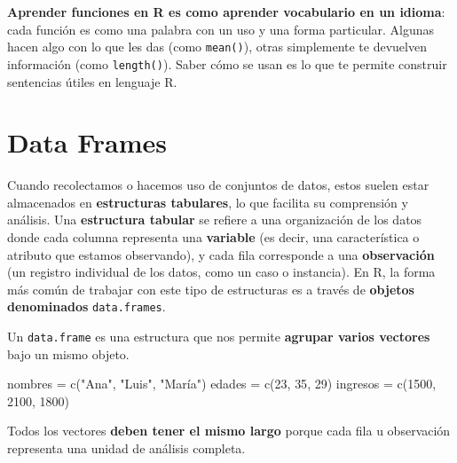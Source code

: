 \documentclass[
  letterpaper,
  DIV=11,
  numbers=noendperiod,
  twoside]{scrreprt}
\newenvironment{Shaded}{\begin{snugshade}}{\end{snugshade}}
\newcommand{\DecValTok}[1]{\textcolor[rgb]{0.68,0.00,0.00}{#1}}
\newcommand{\FunctionTok}[1]{\textcolor[rgb]{0.28,0.35,0.67}{#1}}
\newcommand{\NormalTok}[1]{\textcolor[rgb]{0.00,0.23,0.31}{#1}}
\newcommand{\OtherTok}[1]{\textcolor[rgb]{0.00,0.23,0.31}{#1}}
\newcommand{\StringTok}[1]{\textcolor[rgb]{0.13,0.47,0.30}{#1}}
\begin{document}
\textbf{Aprender funciones en R es como aprender vocabulario en un
idioma}: cada función es como una palabra con un uso y una forma
particular. Algunas hacen algo con lo que les das (como
\texttt{mean()}), otras simplemente te devuelven información (como
\texttt{length()}). Saber cómo se usan es lo que te permite construir
sentencias útiles en lenguaje R.

\chapter{Data Frames}\label{data-frames}

Cuando recolectamos o hacemos uso de conjuntos de datos, estos suelen
estar almacenados en \textbf{estructuras tabulares}, lo que facilita su
comprensión y análisis. Una \textbf{estructura tabular} se refiere a una
organización de los datos donde cada columna representa una
\textbf{variable} (es decir, una característica o atributo que estamos
observando), y cada fila corresponde a una \textbf{observación} (un
registro individual de los datos, como un caso o instancia). En R, la
forma más común de trabajar con este tipo de estructuras es a través de
\textbf{objetos denominados} \texttt{data.frames}.

Un \texttt{data.frame} es una estructura que nos permite \textbf{agrupar
varios vectores} bajo un mismo objeto.

\begin{Shaded}
\begin{Highlighting}[]
\NormalTok{nombres }\OtherTok{=} \FunctionTok{c}\NormalTok{(}\StringTok{"Ana"}\NormalTok{, }\StringTok{"Luis"}\NormalTok{, }\StringTok{"María"}\NormalTok{)}
\NormalTok{edades }\OtherTok{=} \FunctionTok{c}\NormalTok{(}\DecValTok{23}\NormalTok{, }\DecValTok{35}\NormalTok{, }\DecValTok{29}\NormalTok{)}
\NormalTok{ingresos }\OtherTok{=} \FunctionTok{c}\NormalTok{(}\DecValTok{1500}\NormalTok{, }\DecValTok{2100}\NormalTok{, }\DecValTok{1800}\NormalTok{)}
\end{Highlighting}
\end{Shaded}

\begin{tcolorbox}[enhanced jigsaw, titlerule=0mm, title=\textcolor{quarto-callout-caution-color}{\faFire}\hspace{0.5em}{Cuidado}, colback=white, opacityback=0, breakable, toprule=.15mm, left=2mm, leftrule=.75mm, colframe=quarto-callout-caution-color-frame, bottomtitle=1mm, rightrule=.15mm, opacitybacktitle=0.6, coltitle=black, arc=.35mm, bottomrule=.15mm, toptitle=1mm, colbacktitle=quarto-callout-caution-color!10!white]

Todos los vectores \textbf{deben tener el mismo largo} porque cada fila
u observación representa una unidad de análisis completa.

\end{tcolorbox}
\end{document}
